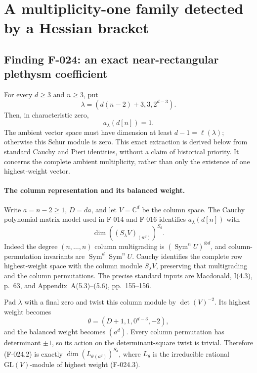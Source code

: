 \section{A multiplicity-one family detected by a Hessian bracket}

\subsection*{Finding F-024: an exact near-rectangular plethysm coefficient}
For every \(d\geq3\) and \(n\geq3\), put
\[
                     \lambda=(d(n-2)+3,3,2^{d-3}).
                                                               \tag{F-024.1}
\]
Then, in characteristic zero,
\begin{equation}\label{eq:F024ambient}
             a_\lambda(d[n])=1.
\end{equation}
The ambient vector space must have dimension at least
\(d-1=\ell(\lambda)\); otherwise this Schur module is zero.
This exact extraction is derived below from standard Cauchy
and Pieri identities, without a claim of historical priority.
It concerns the complete ambient multiplicity, rather than
only the existence of one highest-weight vector.

\paragraph{The column representation and its balanced weight.}
Write \(a=n-2\geq1\), \(D=da\), and let
\(V=\mathbb C^d\) be the column space. The Cauchy
polynomial-matrix model used in F-014 and F-016 identifies
\(a_\lambda(d[n])\) with
\[
                 \dim\left((S_\lambda V)_{(n^d)}\right)^{S_d}.
                                                               \tag{F-024.2}
\]
Indeed the degree \((n,\ldots,n)\) column multigrading
is \((\operatorname{Sym}^n U)^{\otimes d}\), and
column-permutation invariants are
\(\operatorname{Sym}^d\operatorname{Sym}^n U\).
Cauchy identifies the complete row highest-weight space
with the column module \(S_\lambda V\), preserving that
multigrading and the column permutations.
The precise standard inputs are Macdonald, I(4.3), p.~63,
and Appendix~A(5.3)--(5.6), pp.~155--156.

Pad \(\lambda\) with a final zero and twist this column
module by \(\det(V)^{-2}\). Its highest weight becomes
\[
                   \theta=(D+1,1,0^{d-3},-2),
                                                               \tag{F-024.3}
\]
and the balanced weight becomes \((a^d)\).
Every column permutation has determinant \(\pm1\),
so its action on the determinant-square twist is trivial.
Therefore (F-024.2) is exactly
\(\dim(L_\theta{}_{(a^d)})^{S_d}\), where \(L_\theta\)
is the irreducible rational \(\mathrm{GL}(V)\)-module
of highest weight (F-024.3).

